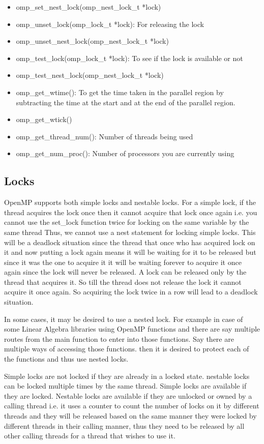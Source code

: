\documentclass[12pt]{article}
\begin{document}
\begin{itemize}
    \item omp\_set\_nest\_lock(omp\_nest\_lock\_t *lock)
    \item omp\_unset\_lock(omp\_lock\_t *lock): For releasing the lock
    \item omp\_unset\_nest\_lock(omp\_nest\_lock\_t *lock)
    \item omp\_test\_lock(omp\_lock\_t *lock): To see if the lock is available or not
    \item omp\_test\_nest\_lock(omp\_nest\_lock\_t *lock)
    \item omp\_get\_wtime(): To get the time taken in the parallel region by subtracting the time at the start and at the end of the parallel region.
    \item omp\_get\_wtick()
    \item omp\_get\_thread\_num(): Number of threads being used
    \item omp\_get\_num\_proc(): Number of processors you are currently using
\end{itemize}

\subsection{Locks}
OpenMP supports both simple locks and nestable locks. For a simple lock, if the thread acquires the lock once then it cannot acquire that lock once again i.e. you cannot use the set\_lock function twice for locking on the same variable by the same thread Thus, we cannot use a nest statement for locking simple locks. This will be a deadlock situation since the thread that once who has acquired lock on it and now putting a lock again means it will be waiting for it to be released but since it was the one to acquire it it will be waiting forever to acquire it once again since the lock will never be released. A lock can be released only by the thread that acquires it. So till the thread does not release the lock it cannot acquire it once again. So acquiring the lock twice in a row will lead to a deadlock situation.

In some cases, it may be desired to use a nested lock. For example in case of some Linear Algebra libraries using OpenMP functions and there are say multiple routes from the main function to enter into those functions. Say there are multiple ways of accessing those functions. then it is desired to protect each of the functions and thus use nested locks.

Simple locks are not locked if they are already in a locked state. nestable locks can be locked multiple times by the same thread. Simple locks are available if they are locked. Nestable locks are available if they are unlocked or owned by a calling thread i.e. it uses a counter to count the number of locks on it by different threads and they will be released based on the same manner they were locked by different threads in their calling manner, thus they need to be released by all other calling threads for a thread that wishes to use it.
\end{document}
